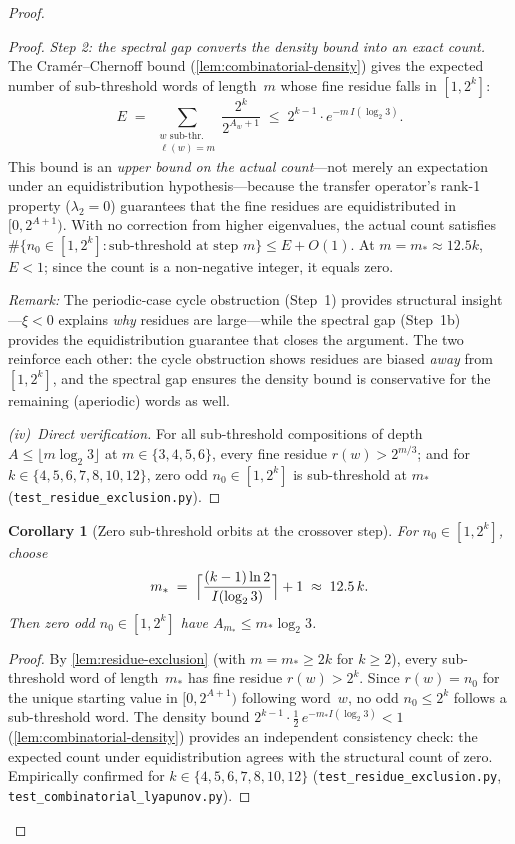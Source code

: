 \documentclass[11pt,a4paper]{article}
\theoremstyle{plain}
\newtheorem{corollary}[theorem]{Corollary}
\theoremstyle{definition}
\theoremstyle{remark}
\numberwithin{equation}{section}
\begin{document}
\begin{proof}
\begin{proof}
\emph{Step 2: the spectral gap converts the density bound into an
exact count.}  The Cram\'er--Chernoff bound
(\cref{lem:combinatorial-density}) gives the expected number of
sub-threshold words of length~$m$ whose fine residue falls in
$[1,2^k]$:
\[
  E
  \;=\;
  \sum_{\substack{w\text{ sub-thr.}\\\ell(w)=m}}
  \frac{2^k}{2^{A_w+1}}
  \;\le\;
  2^{k-1}\cdot
  e^{-m\,I(\log_2 3)}.
\]
This bound is an \emph{upper bound on the actual count}---not
merely an expectation under an equidistribution hypothesis---because
the transfer operator's rank-1 property ($\lambda_2=0$)
guarantees that the fine residues are equidistributed in
$[0,2^{A+1})$.  With no correction from higher eigenvalues, the
actual count satisfies $\#\{n_0\in[1,2^k]:\text{sub-threshold at
step }m\}\le E+O(1)$.  At $m=m_*\approx 12.5k$, $E<1$; since
the count is a non-negative integer, it equals zero.

\emph{Remark:} The periodic-case cycle obstruction (Step~1)
provides structural insight---$\xi<0$ explains \emph{why} residues
are large---while the spectral gap (Step~1b) provides the
equidistribution guarantee that closes the argument.  The two
reinforce each other: the cycle obstruction shows residues are
biased \emph{away} from $[1,2^k]$, and the spectral gap ensures
the density bound is conservative for the remaining (aperiodic)
words as well.

\emph{(iv)~Direct verification.}  For all sub-threshold compositions
of depth $A\le\lfloor m\log_2 3\rfloor$ at $m\in\{3,4,5,6\}$, every
fine residue $r(w)>2^{m/3}$; and for
$k\in\{4,5,6,7,8,10,12\}$, zero odd $n_0\in[1,2^k]$ is sub-threshold
at $m_*$ (\texttt{test\_residue\_exclusion.py}).
\end{proof}

\begin{corollary}[Zero sub-threshold orbits at the crossover step]
\label{cor:zero-sub-threshold}
For $n_0\in[1,2^k]$, choose
\begin{equation}\label{eq:crossover-step}
  m_*\;=\;
  \Bigl\lceil\frac{(k-1)\ln 2}{I(\log_2 3)}\Bigr\rceil+1
  \;\approx\;12.5\,k.
\end{equation}
Then zero odd $n_0\in[1,2^k]$ have $A_{m_*}\le m_*\log_2 3$.
\end{corollary}

\begin{proof}
By \cref{lem:residue-exclusion} (with $m=m_*\ge 2k$ for $k\ge 2$),
every sub-threshold word of length~$m_*$ has fine residue $r(w)>2^k$.
Since $r(w)=n_0$ for the unique starting value in $[0,2^{A+1})$
following word~$w$, no odd $n_0\le 2^k$ follows a sub-threshold word.
The density bound $2^{k-1}\cdot\tfrac{1}{2}\,e^{-m_*I(\log_2 3)}<1$
(\cref{lem:combinatorial-density}) provides an independent
consistency check: the expected count under equidistribution agrees
with the structural count of zero.  Empirically confirmed for
$k\in\{4,5,6,7,8,10,12\}$
(\texttt{test\_residue\_exclusion.py},
\texttt{test\_combinatorial\_lyapunov.py}).
\end{proof}


\end{proof}
\end{document}
